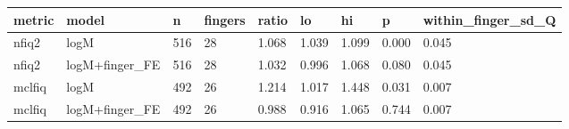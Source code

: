 \begin{tabular}{lllllllll}
\hline
metric & model & n & fingers & ratio & lo & hi & p & within\_finger\_sd\_Q \\
\hline
nfiq2 & logM & 516 & 28 & 1.068 & 1.039 & 1.099 & 0.000 & 0.045 \\
nfiq2 & logM+finger\_FE & 516 & 28 & 1.032 & 0.996 & 1.068 & 0.080 & 0.045 \\
mclfiq & logM & 492 & 26 & 1.214 & 1.017 & 1.448 & 0.031 & 0.007 \\
mclfiq & logM+finger\_FE & 492 & 26 & 0.988 & 0.916 & 1.065 & 0.744 & 0.007 \\
\hline
\end{tabular}
